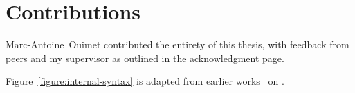 \chapter*{Contributions}

Marc-Antoine~Ouimet contributed the entirety of this thesis, with feedback from peers and my supervisor as outlined in \hyperref[chapter:acknowledgments]{the acknowledgment page}.

Figure~\ref{figure:internal-syntax} is adapted from earlier works~\cite{nanevski2008contextual, germain2010implementation, cave2013first, ferreira2013compiling} on \Beluga.
